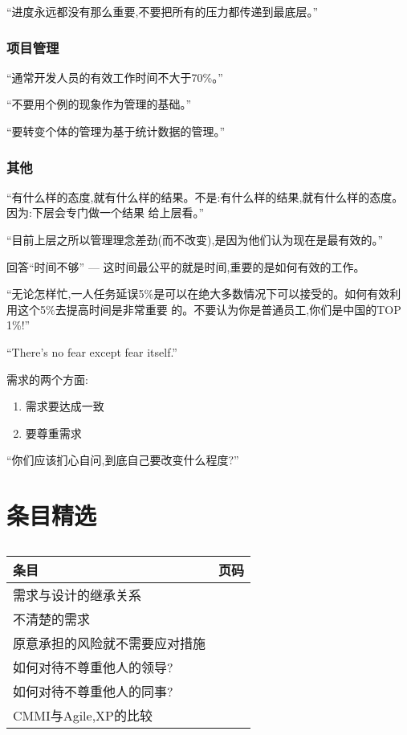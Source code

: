 \documentclass[11pt]{article}
\begin{document}
``进度永远都没有那么重要,不要把所有的压力都传递到最底层。''

\subsubsection{项目管理}

``通常开发人员的有效工作时间不大于70\%。''

``不要用个例的现象作为管理的基础。''

``要转变个体的管理为基于统计数据的管理。''

\subsubsection{其他}

``有什么样的态度,就有什么样的结果。不是:有什么样的结果,就有什么样的态度。因为:下层会专门做一个结果
给上层看。''

``目前上层之所以管理理念差劲(而不改变),是因为他们认为现在是最有效的。''

回答``时间不够'' --- 这时间最公平的就是时间,重要的是如何有效的工作。

``无论怎样忙,一人任务延误5\%是可以在绝大多数情况下可以接受的。如何有效利用这个5\%去提高时间是非常重要
的。不要认为你是普通员工,你们是中国的TOP 1\%!''

``There's no fear except fear itself.''

需求的两个方面:
\begin{enumerate}
 \item 需求要达成一致
 \item 要尊重需求
\end{enumerate}

``你们应该扪心自问,到底自己要改变什么程度?''

\pagebreak
\section{条目精选}
\begin{table}[htbp]
\caption{}
\centering
\begin{tabular}{lc}
\toprule
条目 & 页码 \\
\midrule
需求与设计的继承关系 & \pageref{link1} \\
不清楚的需求 & \pageref{link6} \\
原意承担的风险就不需要应对措施 & \pageref{link2} \\
如何对待不尊重他人的领导? & \pageref{link3} \\
如何对待不尊重他人的同事? & \pageref{link4} \\
CMMI与Agile,XP的比较 & \pageref{link5} \\
\bottomrule
\end{tabular}
\end{table}
\end{document}

